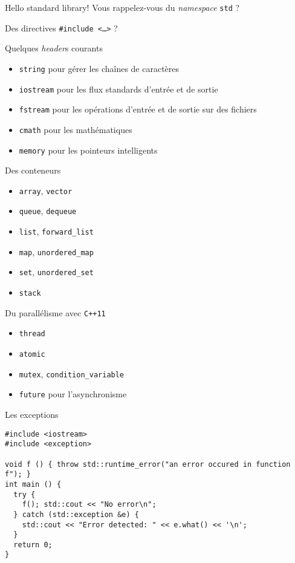 
\begin{frame}{Hello standard library!}
  Vous rappelez-vous du \textit{namespace} \texttt{std} ?

  Des directives \texttt{\#include <\dots{}>} ?
\end{frame}

\begin{frame}{Quelques \textit{header}s courants}
  \begin{itemize}
  \item \texttt{string} pour gérer les chaînes de caractères
  \item \texttt{iostream} pour les flux standards d'entrée et de sortie
  \item \texttt{fstream} pour les opérations d'entrée et de sortie sur des fichiers
  \item \texttt{cmath} pour les mathématiques
  \item \texttt{memory} pour les pointeurs intelligents
  \end{itemize}
\end{frame}

\begin{frame}{Des conteneurs}
  \begin{itemize}
  \item \texttt{array}, \texttt{vector}
  \item \texttt{queue}, \texttt{dequeue}
  \item \texttt{list}, \texttt{forward\_list}
  \item \texttt{map}, \texttt{unordered\_map}
  \item \texttt{set}, \texttt{unordered\_set}
  \item \texttt{stack}
  \end{itemize}
\end{frame}

\begin{frame}{Du parallélisme avec \texttt{C++11}}
  \begin{itemize}
  \item \texttt{thread}
  \item \texttt{atomic}
  \item \texttt{mutex}, \texttt{condition\_variable}
  \item \texttt{future} pour l'asynchronisme
  \end{itemize}
\end{frame}

\begin{frame}[fragile]{Les exceptions}
  \begin{lstlisting}
#include <iostream>
#include <exception>

void f () { throw std::runtime_error("an error occured in function f"); }
int main () {
  try {
    f(); std::cout << "No error\n";
  } catch (std::exception &e) {
    std::cout << "Error detected: " << e.what() << '\n';
  }
  return 0;
}
  \end{lstlisting}
\end{frame}

